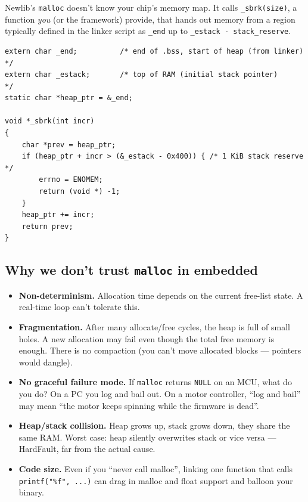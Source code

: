 \documentclass[11pt,a4paper]{article}
\begin{document}
Newlib's \texttt{malloc} doesn't know your chip's memory map. It calls
\texttt{\_sbrk(size)}, a function \emph{you} (or the framework) provide,
that hands out memory from a region typically defined in the linker script
as \texttt{\_end} up to \texttt{\_estack - stack\_reserve}.

\begin{lstlisting}[style=C, caption={Typical \_sbrk for STM32 with newlib}]
extern char _end;          /* end of .bss, start of heap (from linker) */
extern char _estack;       /* top of RAM (initial stack pointer)        */
static char *heap_ptr = &_end;

void *_sbrk(int incr)
{
    char *prev = heap_ptr;
    if (heap_ptr + incr > (&_estack - 0x400)) { /* 1 KiB stack reserve */
        errno = ENOMEM;
        return (void *) -1;
    }
    heap_ptr += incr;
    return prev;
}
\end{lstlisting}

\subsection{Why we don't trust \texttt{malloc} in embedded}

\begin{itemize}[leftmargin=*]
    \item \textbf{Non-determinism.} Allocation time depends on the current
    free-list state. A real-time loop can't tolerate this.
    \item \textbf{Fragmentation.} After many allocate/free cycles, the heap
    is full of small holes. A new allocation may fail even though the total
    free memory is enough. There is no compaction (you can't move allocated
    blocks --- pointers would dangle).
    \item \textbf{No graceful failure mode.} If \texttt{malloc} returns
    \texttt{NULL} on an MCU, what do you do? On a PC you log and bail out.
    On a motor controller, ``log and bail'' may mean ``the motor keeps
    spinning while the firmware is dead''.
    \item \textbf{Heap/stack collision.} Heap grows up, stack grows down,
    they share the same RAM. Worst case: heap silently overwrites stack
    or vice versa --- HardFault, far from the actual cause.
    \item \textbf{Code size.} Even if you ``never call malloc'', linking
    one function that calls \texttt{printf("\%f", ...)} can drag in malloc
    and float support and balloon your binary.
\end{itemize}
\end{document}
